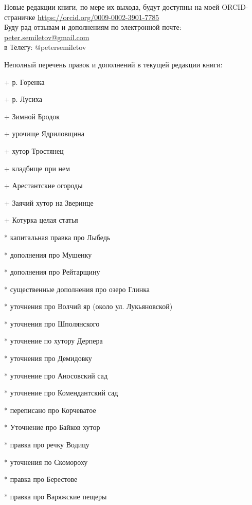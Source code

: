 Новые редакции книги, по мере их выхода, будут доступны на моей ORCID-страничке \href{https://orcid.org/0009-0002-3901-7785}{https://orcid.org/0009-0002-3901-7785}\\

Буду рад отзывам и дополнениям по электронной почте: \href{mailto:peter.semiletov@gmail.com}{peter.semiletov@gmail.com}\\
в Телегу: @petersemiletov

Неполный перечень правок и дополнений в текущей редакции книги:

+ р. Горенка

+ р. Лусиха

+ Зимной Бродок

+ урочище Ядриловщина

+ хутор Тростянец

+ кладбище при нем

+ Арестантские огороды

+ Заячий хутор на Зверинце

+ Котурка целая статья

* капитальная правка про Лыбедь

* дополнения про Мушенку

* дополнения про Рейтарщину

* существенные дополнения про озеро Глинка

* уточнения про Волчий яр (около ул. Лукьяновской)

* уточнения про Шполянского

* уточнение по хутору Дерпера

* уточнения про Демидовку

* уточнение про Аносовский сад

* уточнение про Комендантский сад 

* переписано про Корчеватое

* Уточнение про Байков хутор

* правка про речку Водицу

* уточнения по Скомороху

* правка про Берестове

* правка про Варяжские пещеры
